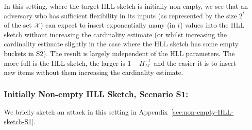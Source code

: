 \documentclass{article}
\begin{document}

In this setting, where the target HLL sketch is initially non-empty, we see that an adversary who has sufficient flexibility in its inputs (as represented by the size $2^t$ of the set ${\cal X}$) can expect to insert exponentially many (in $t$) values into the HLL sketch without increasing the cardinality estimate (or whilst increasing the cardinality estimate slightly in the case where the HLL sketch has some empty buckets in S2). The result is largely independent of the HLL parameters. The more full is the HLL sketch, the larger is $1-H_M^{-1}$ and the easier it is to insert new items without them increasing the cardinality estimate.

\subsubsection{Initially Non-empty HLL Sketch, Scenario S1:} 

We briefly sketch an attack in this setting in Appendix~\ref{sec:non-empty-HLL-sketch-S1}. 
\end{document}
